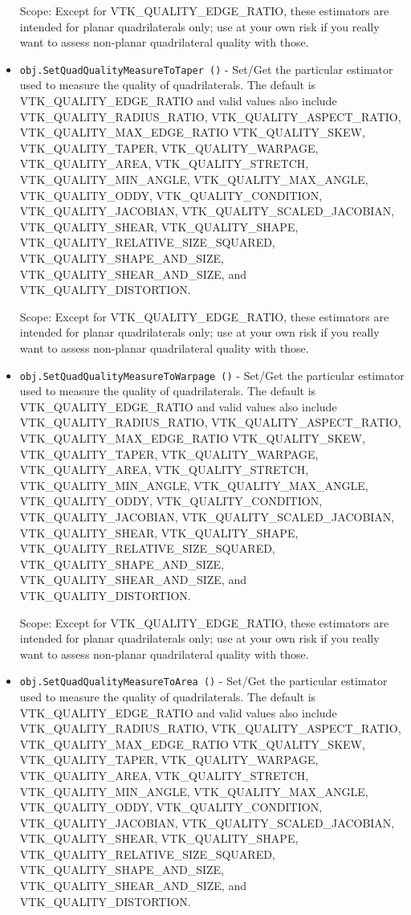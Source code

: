 \begin{itemize}
 Scope: Except for VTK\_QUALITY\_EDGE\_RATIO, these estimators are intended for planar
 quadrilaterals only; use at your own risk if you really want to assess non-planar
 quadrilateral quality with those.

\item  \verb|obj.SetQuadQualityMeasureToTaper ()| -  Set/Get the particular estimator used to measure the quality of quadrilaterals.
 The default is VTK\_QUALITY\_EDGE\_RATIO and valid values also include
 VTK\_QUALITY\_RADIUS\_RATIO, VTK\_QUALITY\_ASPECT\_RATIO, VTK\_QUALITY\_MAX\_EDGE\_RATIO
 VTK\_QUALITY\_SKEW, VTK\_QUALITY\_TAPER, VTK\_QUALITY\_WARPAGE, VTK\_QUALITY\_AREA,
 VTK\_QUALITY\_STRETCH, VTK\_QUALITY\_MIN\_ANGLE, VTK\_QUALITY\_MAX\_ANGLE,
 VTK\_QUALITY\_ODDY, VTK\_QUALITY\_CONDITION, VTK\_QUALITY\_JACOBIAN,
 VTK\_QUALITY\_SCALED\_JACOBIAN, VTK\_QUALITY\_SHEAR, VTK\_QUALITY\_SHAPE,
 VTK\_QUALITY\_RELATIVE\_SIZE\_SQUARED, VTK\_QUALITY\_SHAPE\_AND\_SIZE,
 VTK\_QUALITY\_SHEAR\_AND\_SIZE, and VTK\_QUALITY\_DISTORTION.

 Scope: Except for VTK\_QUALITY\_EDGE\_RATIO, these estimators are intended for planar
 quadrilaterals only; use at your own risk if you really want to assess non-planar
 quadrilateral quality with those.

\item  \verb|obj.SetQuadQualityMeasureToWarpage ()| -  Set/Get the particular estimator used to measure the quality of quadrilaterals.
 The default is VTK\_QUALITY\_EDGE\_RATIO and valid values also include
 VTK\_QUALITY\_RADIUS\_RATIO, VTK\_QUALITY\_ASPECT\_RATIO, VTK\_QUALITY\_MAX\_EDGE\_RATIO
 VTK\_QUALITY\_SKEW, VTK\_QUALITY\_TAPER, VTK\_QUALITY\_WARPAGE, VTK\_QUALITY\_AREA,
 VTK\_QUALITY\_STRETCH, VTK\_QUALITY\_MIN\_ANGLE, VTK\_QUALITY\_MAX\_ANGLE,
 VTK\_QUALITY\_ODDY, VTK\_QUALITY\_CONDITION, VTK\_QUALITY\_JACOBIAN,
 VTK\_QUALITY\_SCALED\_JACOBIAN, VTK\_QUALITY\_SHEAR, VTK\_QUALITY\_SHAPE,
 VTK\_QUALITY\_RELATIVE\_SIZE\_SQUARED, VTK\_QUALITY\_SHAPE\_AND\_SIZE,
 VTK\_QUALITY\_SHEAR\_AND\_SIZE, and VTK\_QUALITY\_DISTORTION.

 Scope: Except for VTK\_QUALITY\_EDGE\_RATIO, these estimators are intended for planar
 quadrilaterals only; use at your own risk if you really want to assess non-planar
 quadrilateral quality with those.

\item  \verb|obj.SetQuadQualityMeasureToArea ()| -  Set/Get the particular estimator used to measure the quality of quadrilaterals.
 The default is VTK\_QUALITY\_EDGE\_RATIO and valid values also include
 VTK\_QUALITY\_RADIUS\_RATIO, VTK\_QUALITY\_ASPECT\_RATIO, VTK\_QUALITY\_MAX\_EDGE\_RATIO
 VTK\_QUALITY\_SKEW, VTK\_QUALITY\_TAPER, VTK\_QUALITY\_WARPAGE, VTK\_QUALITY\_AREA,
 VTK\_QUALITY\_STRETCH, VTK\_QUALITY\_MIN\_ANGLE, VTK\_QUALITY\_MAX\_ANGLE,
 VTK\_QUALITY\_ODDY, VTK\_QUALITY\_CONDITION, VTK\_QUALITY\_JACOBIAN,
 VTK\_QUALITY\_SCALED\_JACOBIAN, VTK\_QUALITY\_SHEAR, VTK\_QUALITY\_SHAPE,
 VTK\_QUALITY\_RELATIVE\_SIZE\_SQUARED, VTK\_QUALITY\_SHAPE\_AND\_SIZE,
 VTK\_QUALITY\_SHEAR\_AND\_SIZE, and VTK\_QUALITY\_DISTORTION.


\end{itemize}
